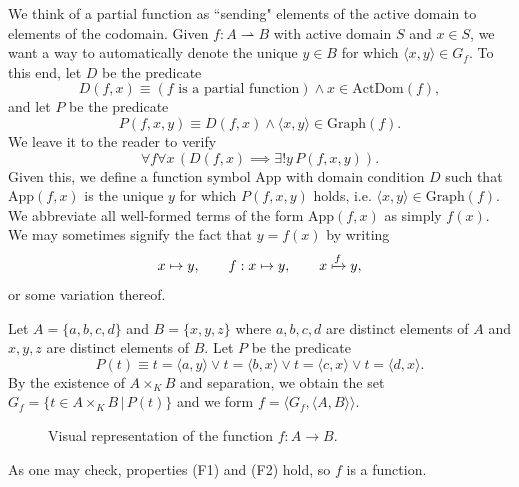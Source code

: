 We think of a partial function as ``sending" elements of the active domain to elements of the codomain.
Given $f:A\rightharpoonup B$ with active domain $S$ and $x\in S$, we want a way to automatically denote the unique $y\in B$ for which $\langle x, y\rangle\in G_{f}$. 
To this end, let $D$ be the predicate
\[ D(f, x)\equiv (f\text{ is a partial function})\land x\in\textrm{ActDom}(f), \]
and let $P$ be the predicate
\[ P(f, x, y)\equiv D(f, x)\land \langle x, y\rangle\in\textrm{Graph}(f). \]
We leave it to the reader to verify 
\[ \forall f\forall x\, (D(f, x)\implies \exists ! y\, P(f, x, y)). \]
Given this, we define a function symbol $\textrm{App}$ with domain condition $D$ such that $\textrm{App}(f, x)$ is the unique $y$ for which $P(f, x, y)$ holds, i.e. $\langle x, y\rangle\in\textrm{Graph}(f)$.
We abbreviate all well-formed terms of the form $\textrm{App}(f, x)$ as simply $f(x)$. 
We may sometimes signify the fact that $y = f(x)$ by writing 
\[ x\mapsto y, \qquad f:x\mapsto y, \qquad x\xmapsto{f} y, \] 
or some variation thereof.

\begin{example}\label{ch1ex_fn}
	Let $A = \{a, b, c, d\}$ and $B = \{x, y, z\}$ where $a, b, c, d$ are distinct elements of $A$ and $x, y, z$ are distinct elements of $B$.	
	Let $P$ be the predicate
	\[ P(t)\equiv t = \langle a, y\rangle \lor t = \langle b, x\rangle \lor t = \langle c, x\rangle \lor t = \langle d, x\rangle. \]
	By the existence of $A\times_{K} B$ and separation, we obtain the set $G_{f} = \{ t\in A\times_{K} B \,|\, P(t) \}$ and we form $f = \langle G_{f}, \langle A, B\rangle\rangle$. 
	\begin{figure}[H]
		\centering
		\caption{Visual representation of the function $f:A\rightarrow B$.}
	\end{figure}
	
	\noindent As one may check, properties (F1) and (F2) hold, so $f$ is a function. 
\end{example}


